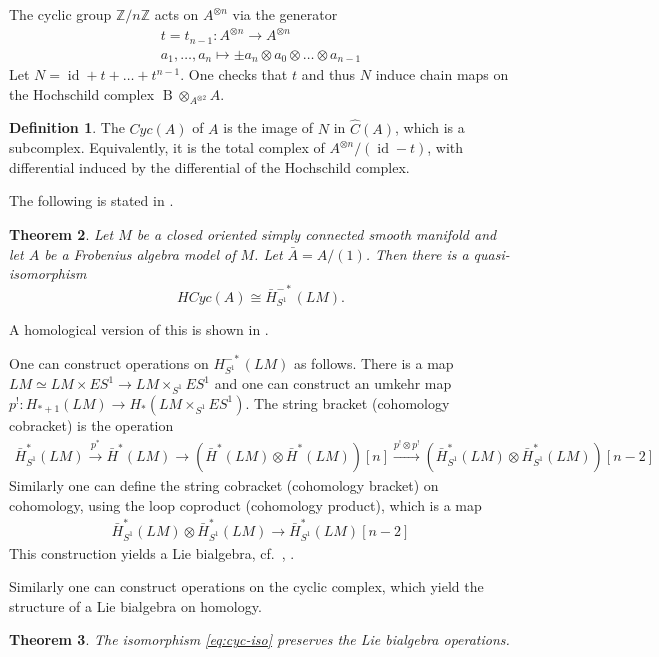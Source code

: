 \documentclass{scrartcl}
\let\emph\relax
\theoremstyle{plain}
\newtheorem{theorem}{Theorem}[section]
\theoremstyle{definition}
\newtheorem{definition}[theorem]{Definition}
\newcommand{\Z}{\mathbb Z}
\newcommand{\iso}{\cong}
\newcommand{\quiso}{\simeq}
\let\xto\xrightarrow
\DeclareMathOperator{\id}{id}
\DeclareMathOperator{\BC}{B}
\begin{document}
The cyclic group $\Z/n\Z$ acts on $A^{\otimes n}$ via the generator
\begin{align*}
    t=t_{n-1}\colon A^{\otimes n}\to A^{\otimes n} \\
    a_1, \dots, a_n \mapsto \pm a_n\otimes a_0\otimes\dots\otimes a_{n-1}
\end{align*}
Let $N = \id+t+\dots+t^{n-1}$. One checks that $t$ and thus $N$ induce chain maps on the Hochschild complex $\BC\otimes_{A^{\otimes 2}} A $.

\begin{definition}
The \emph{cyclic complex} $Cyc(A)$ of $A$ is the image of $N$ in $\hat C(A)$, which is a subcomplex.  Equivalently, it is the total complex of $A^{\otimes n} / (\id-t)$, with differential induced by the differential of the Hochschild complex. 
\end{definition}

The following is stated in \cite{naef2019string}.
\begin{theorem}
Let $M$ be a closed oriented simply connected smooth manifold and let $A$ be a Frobenius algebra model of $M$. Let $\bar A = A / (1)$. Then there is a quasi-isomorphism \begin{equation}HCyc(A) \iso \bar H^{-*}_{S^1}(LM).\label{eq:cyc-iso}\end{equation} 
\end{theorem}
A homological version of this is shown in \cite{Chen_2010}. 

One can construct operations on $H^{-*}_{S^1}(LM)$ as follows. There is a map $LM \quiso LM\times ES^1\to LM\times_{S^1} ES^1$ and one can construct an umkehr map $p^!\colon H_{*+1}(LM) \to H_*(LM\times_{S^1} ES^1)$. The string bracket (cohomology cobracket) is the operation 
\begin{align*}
    \bar H^*_{S^1}(LM)\xto{p^*} \bar H^*(LM)\to (\bar H^*(LM) \otimes \bar H^*(LM))[n] \xto{p^!\otimes p^!} (\bar H_{S^1}^*(LM)\otimes \bar H_{S^1}^*(LM))[n-2]
\end{align*}
Similarly one can define the string cobracket (cohomology bracket) on cohomology, using the loop coproduct (cohomology product), which is a map
\begin{align*}
    \bar H^*_{S^1}(LM)\otimes \bar H^*_{S^1}(LM) \to \bar H^*_{S^1}(LM)[n-2]
\end{align*}
This construction yields a Lie bialgebra, cf.~\cite{chas1999string}, \cite{chas2004closed}. 

Similarly one can construct operations on the cyclic complex, which yield the structure of a Lie bialgebra on homology. 
\begin{theorem} The isomorphism \ref{eq:cyc-iso} preserves the Lie bialgebra operations. 
\end{theorem}
\end{document}
